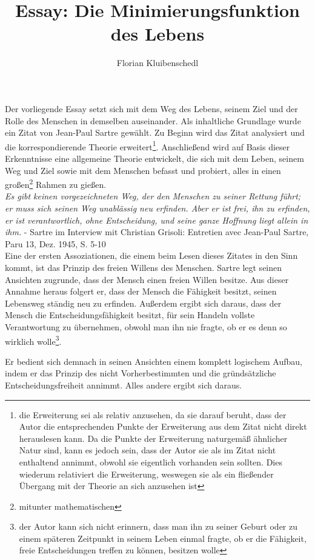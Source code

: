\documentclass[12pt,a4paper,oneside]{article}
\author{Florian Kluibenschedl}
\title{Essay: Die Minimierungsfunktion des Lebens}
\begin{document}
  \maketitle
  
  Der vorliegende Essay setzt sich mit dem Weg des Lebens, seinem Ziel und der Rolle des Menschen in demselben auseinander. Als inhaltliche Grundlage wurde ein Zitat von Jean-Paul Sartre gewählt. Zu Beginn wird das Zitat analysiert und die korrespondierende Theorie erweitert\footnote{die Erweiterung sei als relativ anzusehen, da sie darauf beruht, dass der Autor die entsprechenden Punkte der Erweiterung aus dem Zitat nicht direkt herauslesen kann. Da die Punkte der Erweiterung naturgemäß ähnlicher Natur sind, kann es jedoch sein, dass der Autor sie als im Zitat nicht enthaltend annimmt, obwohl sie eigentlich vorhanden sein sollten. Dies wiederum relativiert die Erweiterung, weswegen sie als ein fließender Übergang mit der Theorie an sich anzusehen ist}. Anschließend wird auf Basis dieser Erkenntnisse eine allgemeine Theorie entwickelt, die sich mit dem Leben, seinem Weg und Ziel sowie mit dem Menschen befasst und probiert, alles in einen großen\footnote{mitunter mathematischen}  Rahmen zu gießen. \\
  
  \textit{\glqq Es gibt keinen vorgezeichneten Weg, der den Menschen zu seiner Rettung führt; er muss sich seinen Weg unablässig neu erfinden. Aber er ist frei, ihn zu erfinden, er ist verantwortlich, ohne Entscheidung, und seine ganze Hoffnung liegt allein in ihm.\grqq} - Sartre im Interview mit Christian Grisoli: \glqq Entretien avec Jean-Paul Sartre\grqq , Paru 13, Dez. 1945, S. 5-10 \\
  
  Eine der ersten Assoziationen, die einem beim Lesen dieses Zitates in den Sinn kommt, ist das Prinzip des freien Willens des Menschen. Sartre legt seinen Ansichten zugrunde, dass der Mensch einen freien Willen besitze. Aus dieser Annahme heraus folgert er, dass der Mensch die Fähigkeit besitzt, seinen Lebensweg ständig neu zu erfinden. Außerdem ergibt sich daraus, dass der Mensch die Entscheidungsfähigkeit besitzt, für sein Handeln vollste Verantwortung zu übernehmen, obwohl man ihn nie fragte, ob er es denn so wirklich wolle\footnote{der Autor kann sich nicht erinnern, dass man ihn zu seiner Geburt oder zu einem späteren Zeitpunkt in seinem Leben einmal fragte, ob er die Fähigkeit, freie Entscheidungen treffen zu können, besitzen wolle}. 
  
  Er bedient sich demnach in seinen Ansichten einem komplett logischem Aufbau, indem er das Prinzip des nicht Vorherbestimmten und die gründsätzliche Entscheidungsfreiheit annimmt. Alles andere ergibt sich daraus. \\
  
\end{document}
